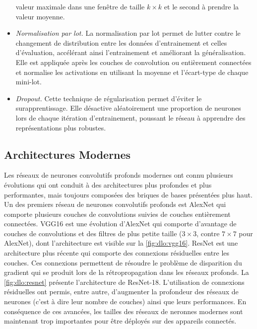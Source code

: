 \begin{itemize}
        valeur maximale dans une fenêtre de taille $k \times k$ et le second à
        prendre la valeur moyenne.
  \item \emph{Normalisation par lot.} La normalisation par lot permet de lutter
        contre le changement de distribution entre les données d'entrainement et
        celles d'évaluation, accélérant ainsi l'entrainement et améliorant la
        généralisation. Elle est appliquée après les couches de convolution ou
        entièrement connectées et normalise les activations en utilisant la
        moyenne et l'écart-type de chaque mini-lot.
  \item \emph{Dropout.} Cette technique de régularisation permet d'éviter
        le surapprentissage. Elle désactive aléatoirement une proportion de neurones
        lors de chaque itération d'entrainement, poussant le réseau à apprendre des
        représentations plus robustes.
\end{itemize}

\subsection*{Architectures Modernes}

Les réseaux de neurones convolutifs profonds modernes ont connu plusieurs
évolutions qui ont conduit à des architectures plus profondes et plus
performantes, mais toujours composées des briques de bases présentées plus haut.
Un des premiers réseau de neurones convolutifs profonds est AlexNet
\cite{DBLP:conf/nips/KrizhevskySH12} qui comporte plusieurs couches de
convolutions suivies de couches entièrement connectées. VGG16
\cite{DBLP:journals/corr/SimonyanZ14a} est une évolution d'AlexNet qui comporte
d'avantage de couches de convolutions et des filtres de plus petite taille
($3\times 3$, contre $7 \times 7$ pour AlexNet), dont l'architecture est visible
sur la \cref{fig:dlo:vgg16}. ResNet \cite{DBLP:conf/cvpr/HeZRS16} est une
architecture plus récente qui comporte des connexions résiduelles entre les
couches. Ces connexions permettent de résoudre le problème de disparition du
gradient qui se produit lors de la rétropropagation dans les réseaux profonds.
La \cref{fig:dlo:resnet} présente l'architecture de ResNet-18. L'utilisation de
connexions résiduelles ont permis, entre autre, d'augmenter la profondeur des
réseaux de neurones (c'est à dire leur nombre de couches) ainsi que leurs
performances. En conséquence de ces avancées, les tailles des réseaux de
neronnes modernes sont maintenant trop importantes pour être déployés sur des
appareils connectés.\\


